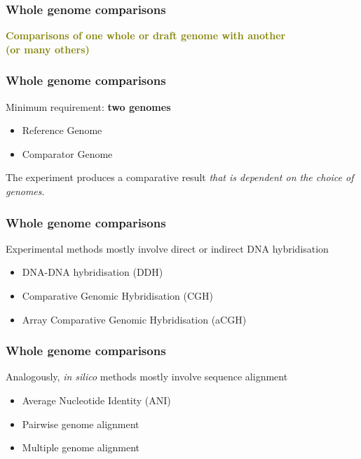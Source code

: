 
%
\begin{frame}
  \frametitle{Whole genome comparisons}
  \Large{
    \textcolor{olive}{
      \textbf{
      Comparisons of one whole or draft genome with another \\
      (or many others)
      }
    }
  }
\end{frame}

%
\begin{frame}
  \frametitle{Whole genome comparisons}
  Minimum requirement: \textbf{two genomes} \\
  \begin{itemize}
    \item \textcolor{hutton_green}{Reference Genome}
    \item \textcolor{hutton_blue}{Comparator Genome}
  \end{itemize}
  The experiment produces a comparative result \textcolor{hutton_purple}{\textit{that is dependent on the choice of genomes}}.
\end{frame}

%
\begin{frame}
  \frametitle{Whole genome comparisons}
  Experimental methods mostly involve direct or indirect DNA hybridisation \\
  \begin{itemize}
    \item \textcolor{hutton_green}{DNA-DNA hybridisation (DDH)}
    \item \textcolor{hutton_blue}{Comparative Genomic Hybridisation (CGH)}
    \item \textcolor{hutton_purple}{Array Comparative Genomic Hybridisation (aCGH)}    
  \end{itemize}
\end{frame}

%
\begin{frame}
  \frametitle{Whole genome comparisons}
  Analogously, \textit{in silico} methods mostly involve sequence alignment \\
  \begin{itemize}
    \item \textcolor{hutton_green}{Average Nucleotide Identity (ANI)}
    \item \textcolor{hutton_blue}{Pairwise genome alignment}
    \item \textcolor{hutton_purple}{Multiple genome alignment}    
  \end{itemize}
\end{frame}